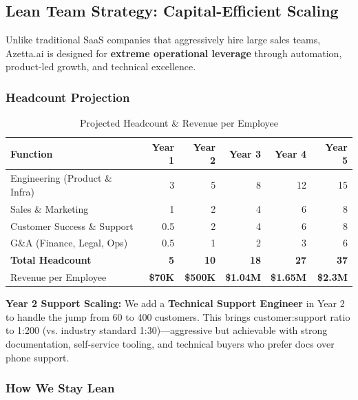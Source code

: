 \subsection{Lean Team Strategy: Capital-Efficient Scaling}

Unlike traditional SaaS companies that aggressively hire large sales teams, Azetta.ai is designed for \textbf{extreme operational leverage} through automation, product-led growth, and technical excellence.

\subsubsection{Headcount Projection}

\begin{table}[ht]
\centering
\small
\begin{tabular}{|l|r|r|r|r|r|}
\hline
\textbf{Function} & \textbf{Year 1} & \textbf{Year 2} & \textbf{Year 3} & \textbf{Year 4} & \textbf{Year 5} \\
\hline
Engineering (Product \& Infra) & 3 & 5 & 8 & 12 & 15 \\
Sales \& Marketing & 1 & 2 & 4 & 6 & 8 \\
Customer Success \& Support & 0.5 & 2 & 4 & 6 & 8 \\
G\&A (Finance, Legal, Ops) & 0.5 & 1 & 2 & 3 & 6 \\
\hline
\textbf{Total Headcount} & \textbf{5} & \textbf{10} & \textbf{18} & \textbf{27} & \textbf{37} \\
\hline
\hline
Revenue per Employee & \textbf{\$70K} & \textbf{\$500K} & \textbf{\$1.04M} & \textbf{\$1.65M} & \textbf{\$2.3M} \\
\hline
\end{tabular}
\caption{Projected Headcount \& Revenue per Employee}
\end{table}

\textbf{Year 2 Support Scaling:} We add a \textbf{Technical Support Engineer} in Year 2 to handle the jump from 60 to 400 customers. This brings customer:support ratio to 1:200 (vs. industry standard 1:30)—aggressive but achievable with strong documentation, self-service tooling, and technical buyers who prefer docs over phone support.

\subsubsection{How We Stay Lean}

